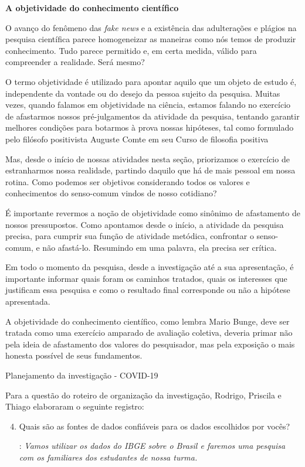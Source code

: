 \begin{reflection}
\textbf{A objetividade do conhecimento científico}

O avanço do fenômeno das \textit{fake news} e a existência das adulterações e plágios na pesquisa científica parece homogeneizar as maneiras como nós temos de produzir conhecimento. Tudo parece permitido e, em certa medida, válido para compreender a realidade. Será mesmo?

O termo objetividade é utilizado para apontar aquilo que um objeto de estudo é, independente da vontade ou do desejo da pessoa sujeito da pesquisa. Muitas vezes, quando falamos em objetividade na ciência, estamos falando no exercício de afastarmos nossos pré-julgamentos da atividade da pesquisa, tentando garantir melhores condições para botarmos à prova nossas hipóteses, tal como formulado pelo filósofo positivista Auguste Comte em seu Curso de filosofia positiva

Mas, desde o início de nossas atividades nesta seção, priorizamos o exercício de estranharmos nossa realidade, partindo daquilo que há de mais pessoal em nossa rotina. Como podemos ser objetivos considerando todos os valores e conhecimentos do senso-comum vindos de nosso cotidiano?

É importante revermos a noção de objetividade como sinônimo de afastamento de nossos pressupostos. Como apontamos desde o início, a atividade da pesquisa precisa, para cumprir sua função de atividade metódica, confrontar o senso-comum, e não afastá-lo. Resumindo em uma palavra, ela precisa ser crítica.

Em todo o momento da pesquisa, desde a investigação até a sua apresentação, é importante informar quais foram os caminhos tratados, quais os interesses que justificam essa pesquisa e como o resultado final corresponde ou não a hipótese apresentada.

A objetividade do conhecimento científico, como lembra Mario Bunge, deve ser tratada como uma exercício amparado de avaliação coletiva, deveria primar não pela ideia de afastamento dos valores do pesquisador, mas pela exposição o mais honesta possível de seus fundamentos.

\end{reflection}

\begin{example}{Planejamento da investigação - COVID-19}

Para a questão  do roteiro de organização da investigação, Rodrigo, Priscila e Thiago elaboraram o seguinte registro:

\begin{enumerate}[label=\titem{\arabic*)}]\setcounter{enumi}{3}
\item Quais são as fontes de dados confiáveis para os dados escolhidos por vocês?

: \textit{Vamos utilizar os dados do IBGE sobre o Brasil e faremos uma pesquisa com os familiares dos estudantes de nossa turma. }
\end{enumerate}
\end{example}

